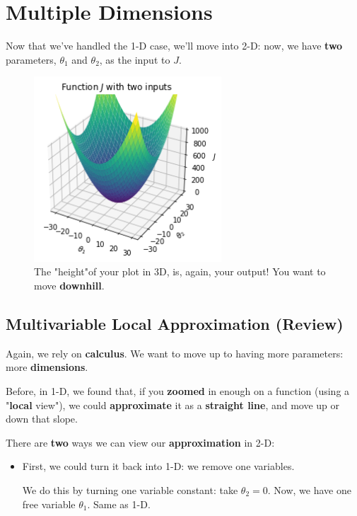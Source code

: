 \section{Multiple Dimensions}

    Now that we've handled the 1-D case, we'll move into 2-D: now, we have \textbf{two} parameters, $\theta_1$ and $\theta_2$, as the input to $J$.
    
    \begin{figure}[H]
        \centering
            \includegraphics[width=70mm,scale=0.5]{images/gradient_descent_images/3dplot.png}
        
        \caption*{The "height"of your plot in 3D, is, again, your output! You want to move \textbf{downhill}.}
    \end{figure}
        
    \subsection{Multivariable Local Approximation (Review)}
    
        Again, we rely on \textbf{calculus}. We want to move up to having more parameters: more \textbf{dimensions}. 
        
        Before, in 1-D, we found that, if you \textbf{zoomed} in enough on a function (using a "\textbf{local} view"), we could \textbf{approximate} it as a \textbf{straight line}, and move up or down that slope.
        
        There are \textbf{two} ways we can view our \textbf{approximation} in 2-D:
        
        \begin{itemize}
            \item First, we could turn it back into 1-D: we remove one variables.
            
            We do this by turning one variable constant: take $\theta_2=0$. Now, we have one free variable $\theta_1$. Same as 1-D.\\
        \end{itemize}
        
